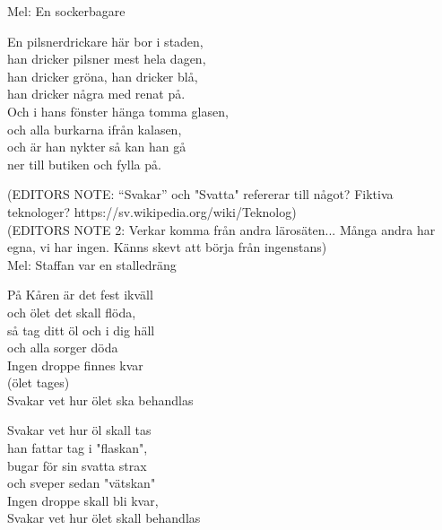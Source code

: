 \begin{SongText}[En pilsnerdrickare]
    \begin{SongInfo}
        Mel: En sockerbagare
    \end{SongInfo}
    \begin{SongVerse}
        En pilsnerdrickare här bor i staden,\\%
        han dricker pilsner mest hela dagen,\\%
        han dricker gröna, han dricker blå,\\%
        han dricker några med renat på.\\%
        Och i hans fönster hänga tomma glasen,\\%
        och alla burkarna ifrån kalasen,\\%
        och är han nykter så kan han gå\\%
        ner till butiken och fylla på.
    \end{SongVerse}
\end{SongText}
\begin{SongText}[Ölvisa]
    \begin{SongInfo}
        (EDITORS NOTE: “Svakar” och "Svatta" refererar till något? Fiktiva teknologer? https://sv.wikipedia.org/wiki/Teknolog)\\%
        (EDITORS NOTE 2: Verkar komma från andra lärosäten... Många andra har egna, vi har ingen. Känns skevt att börja från ingenstans)\\%
        Mel: Staffan var en stalledräng
    \end{SongInfo}
    \begin{SongVerse}
        På Kåren är det fest ikväll\\%
        och ölet det skall flöda,\\%
        så tag ditt öl och i dig häll\\%
        och alla sorger döda\\%
        Ingen droppe finnes kvar\\%
        (ölet tages)\\%
        Svakar vet hur ölet ska behandlas
    \end{SongVerse}
    \begin{SongVerse}
        Svakar vet hur öl skall tas\\%
        han fattar tag i "flaskan",\\%
        bugar för sin svatta strax\\%
        och sveper sedan "vätskan"\\%
        Ingen droppe skall bli kvar,\\%
        Svakar vet hur ölet skall behandlas
    \end{SongVerse}
\end{SongText}
